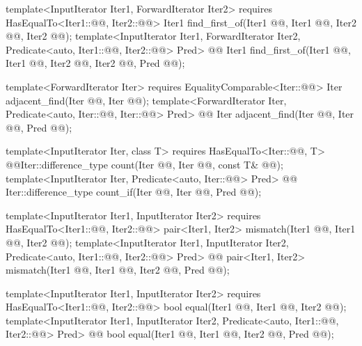 \documentclass[american,twoside]{book}
\begin{document}
\begin{paras}
\begin{codeblock}
{  template<InputIterator Iter1, ForwardIterator Iter2>
    requires HasEqualTo<Iter1::@@, Iter2::@@>
    Iter1 find_first_of(Iter1 @@, Iter1 @@,
                        Iter2 @@, Iter2 @@);
  template<InputIterator Iter1, ForwardIterator Iter2,
           Predicate<auto, Iter1::@@, Iter2::@@> Pred>
    @@
    Iter1 find_first_of(Iter1 @@, Iter1 @@,
                        Iter2 @@, Iter2 @@,
                        Pred @@);

  template<ForwardIterator Iter>
    requires EqualityComparable<Iter::@@>
    Iter adjacent_find(Iter @@, Iter @@);
  template<ForwardIterator Iter, 
           Predicate<auto, Iter::@@, Iter::@@> Pred>
    @@
    Iter adjacent_find(Iter @@, Iter @@, Pred @@);

  template<InputIterator Iter, class T>
    requires HasEqualTo<Iter::@@, T>
    @\color{addclr}@Iter::difference_type count(Iter @@, Iter @@, const T& @@);
  template<InputIterator Iter, Predicate<auto, Iter::@@> Pred>
    @@
    Iter::difference_type count_if(Iter @@, Iter @@, Pred @@);

  template<InputIterator Iter1, InputIterator Iter2>
    requires HasEqualTo<Iter1::@@, Iter2::@@>
    pair<Iter1, Iter2> mismatch(Iter1 @@, Iter1 @@,
                                Iter2 @@);
  template<InputIterator Iter1, InputIterator Iter2,
           Predicate<auto, Iter1::@@, Iter2::@@> Pred>
    @@
    pair<Iter1, Iter2> mismatch(Iter1 @@, Iter1 @@,
                                Iter2 @@, Pred @@);

  template<InputIterator Iter1, InputIterator Iter2>
    requires HasEqualTo<Iter1::@@, Iter2::@@>
    bool equal(Iter1 @@, Iter1 @@,
               Iter2 @@);
  template<InputIterator Iter1, InputIterator Iter2,
           Predicate<auto, Iter1::@@, Iter2::@@> Pred>
    @@
    bool equal(Iter1 @@, Iter1 @@,
               Iter2 @@, Pred @@);

}
\end{codeblock}
\end{paras}
\end{document}
